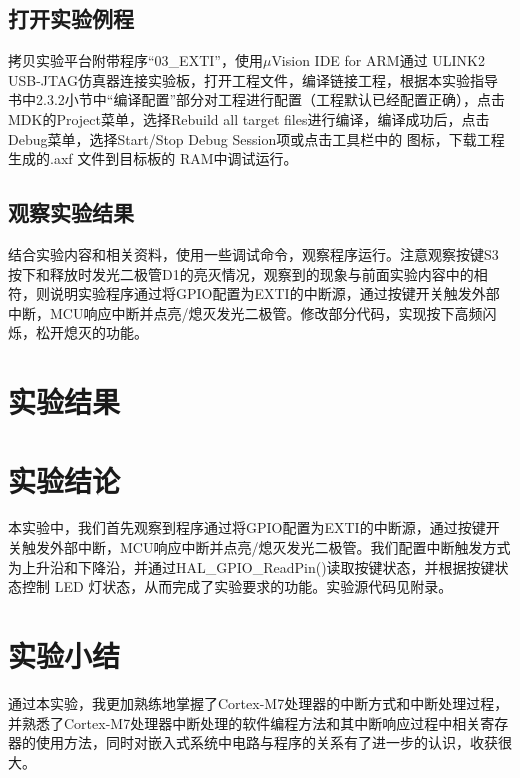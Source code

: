 ﻿\documentclass[UTF8,12pt]{article}
\begin{document}
\subsection{打开实验例程}
拷贝实验平台附带程序“03\_EXTI”，使用$\mu$Vision IDE for ARM通过 ULINK2 USB-JTAG仿真器连接实验板，打开工程文件，编译链接工程，根据本实验指导书中2.3.2小节中“编译配置”部分对工程进行配置（工程默认已经配置正确），点击MDK的Project菜单，选择Rebuild all target files进行编译，编译成功后，点击Debug菜单，选择Start/Stop Debug Session项或点击工具栏中的 图标，下载工程生成的.axf 文件到目标板的 RAM中调试运行。

\subsection{观察实验结果}
结合实验内容和相关资料，使用一些调试命令，观察程序运行。注意观察按键S3按下和释放时发光二极管D1的亮灭情况，观察到的现象与前面实验内容中的相符，则说明实验程序通过将GPIO配置为EXTI的中断源，通过按键开关触发外部中断，MCU响应中断并点亮/熄灭发光二极管。修改部分代码，实现按下高频闪烁，松开熄灭的功能。

\section{实验结果}

\section{实验结论}
本实验中，我们首先观察到程序通过将GPIO配置为EXTI的中断源，通过按键开关触发外部中断，MCU响应中断并点亮/熄灭发光二极管。我们配置中断触发方式为上升沿和下降沿，并通过HAL\_GPIO\_ReadPin()读取按键状态，并根据按键状态控制 LED 灯状态，从而完成了实验要求的功能。实验源代码见附录。

\section{实验小结}
通过本实验，我更加熟练地掌握了Cortex-M7处理器的中断方式和中断处理过程，并熟悉了Cortex-M7处理器中断处理的软件编程方法和其中断响应过程中相关寄存器的使用方法，同时对嵌入式系统中电路与程序的关系有了进一步的认识，收获很大。

\newpage
\end{document}

